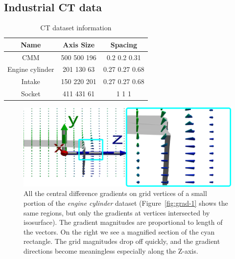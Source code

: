 \subsection{Industrial CT data} 
\tiny
\begin{table}
	\centering
	\begin{tabular}{|c c c |} 
		\hline
		Name & Axis Size & Spacing  \\ [0.5ex] 
		\hline
        CMM & 500 500 196 & 0.2 0.2 0.31\\
		Engine cylinder & 201 130 63 & 0.27 0.27 0.68 \\
        Intake &  150 220 201 & 0.27 0.27 0.68 \\
        Socket & 411 431 61 & 1 1 1 \\
		\hline
	\end{tabular}
	\caption{CT dataset information}
	\label{table:ictDataInfo}
\end{table}
\normalsize

\begin{figure}[htb]
    \centering
    \includegraphics[width=\linewidth]{images/cdiff.all.new.eps}
    \caption{All the central difference gradients on  grid vertices of a small portion of the \textit{engine cylinder} dataset
	(Figure~\ref{fig:grad-1} shows the same regions, 
	but only the gradients at vertices intersected by isosurface).
	The gradient magnitudes are proportional to length of the vectors.
	On the right we see a magnified section of the cyan rectangle.
    The grid magnitudes drop off quickly, and the gradient directions become meaningless especially along the Z-axis. 
    }
    \label{fig:setA.crop1.cdiff}
\end{figure}

